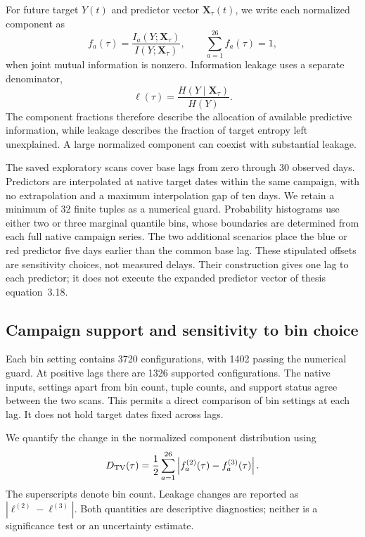 For future target $Y(t)$ and predictor vector $\mathbf{X}_{\tau}(t)$,
we write each normalized component as
\begin{equation}
 f_a(\tau)=\frac{I_a(Y;\mathbf{X}_{\tau})}
 {I(Y;\mathbf{X}_{\tau})},
 \qquad \sum_{a=1}^{26}f_a(\tau)=1,
 \label{eq:cr_component_normalization}
\end{equation}
when joint mutual information is nonzero. Information leakage uses a
separate denominator,
\begin{equation}
 \ell(\tau)=\frac{H(Y\mid\mathbf{X}_{\tau})}{H(Y)}.
 \label{eq:cr_leakage}
\end{equation}
The component fractions therefore describe the allocation of available
predictive information, while leakage describes the fraction of target
entropy left unexplained. A large normalized component can coexist with
substantial leakage.

The saved exploratory scans cover base lags from zero through 30 observed
days. Predictors are interpolated at native target dates within the same
campaign, with no extrapolation and a maximum interpolation gap of ten days.
We retain a minimum of 32 finite tuples as a numerical guard.
Probability histograms use either two or three marginal quantile bins,
whose boundaries are determined from each full native campaign series.
The two additional scenarios place the blue or red predictor five days
earlier than the common base lag. These stipulated offsets are sensitivity
choices, not measured delays. Their construction gives one lag to each
predictor; it does not execute the expanded predictor vector of thesis
equation~3.18.

\subsection{Campaign support and sensitivity to bin choice}

Each bin setting contains 3720 configurations, with 1402 passing the
numerical guard. At positive lags there are 1326 supported configurations.
The native inputs, settings apart from bin count, tuple counts, and support
status agree between the two scans. This permits a direct comparison of
bin settings at each lag. It does not hold target dates fixed across lags.

We quantify the change in the normalized component distribution using
\begin{equation}
 D_{\rm TV}(\tau)=\frac{1}{2}\sum_{a=1}^{26}
 \left|f_a^{(2)}(\tau)-f_a^{(3)}(\tau)\right|.
 \label{eq:cr_tv}
\end{equation}
The superscripts denote bin count. Leakage changes are reported as
$|\ell^{(2)}-\ell^{(3)}|$. Both quantities are descriptive diagnostics;
neither is a significance test or an uncertainty estimate.

